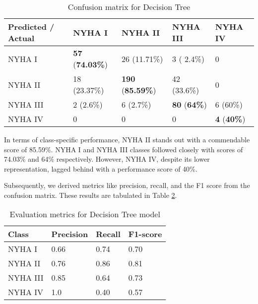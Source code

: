 \begin{table}[H]
\centering
\caption{Confusion matrix for Decision Tree}
\label{tab:decision_tree_confusion_matrix}
\begin{tabular}{|p{3.5cm}|p{2.5cm}|p{2.5cm}|p{2.2cm}|p{1.8cm}|}
\hline
Predicted / Actual          & NYHA I       & NYHA II      & NYHA III    & NYHA IV  \\ \hline
NYHA I                      & \textbf{57} (\textbf{74.03\%}) & 26 (11.71\%)   & 3 ( 2.4\%)   & 0        \\ \hline
NYHA II                     & 18 (23.37\%) & \textbf{190} (\textbf{85.59\%}) & 42 (33.6\%) & 0        \\ \hline
NYHA III                    & 2 (2.6\%)   & 6 (2.7\%)   & \textbf{80} (\textbf{64\%}) & 6 (60\%) \\ \hline
NYHA IV                     & 0            & 0            & 0           & \textbf{4} (\textbf{40\%}) \\ \hline
\end{tabular}
\end{table}
In terms of class-specific performance, NYHA II stands out with a commendable score of 85.59\%. NYHA I and NYHA III classes followed closely with scores of 74.03\% and 64\% respectively. However, NYHA IV, despite its lower representation, lagged behind with a performance score of 40\%.

Subsequently, we derived metrics like precision, recall, and the F1 score from the confusion matrix. These results are tabulated in Table \ref{tab:metrics decision tree}.

\begin{table}[H]
\centering
\caption{Evaluation metrics for Decision Tree model}
\label{tab:metrics decision tree}
\begin{tabular}{|p{2cm}|p{2cm}|p{1.5cm}|p{2cm}|}
\hline
\textbf{Class} & \textbf{Precision} & \textbf{Recall} & \textbf{F1-score} \\ \hline
NYHA I         & 0.66               & 0.74            & 0.70              \\ 
NYHA II        & 0.76               & 0.86            & 0.81              \\ 
NYHA III       & 0.85               & 0.64            & 0.73              \\
NYHA IV        & 1.0                & 0.40             & 0.57              \\ \hline
\end{tabular}
\end{table}

